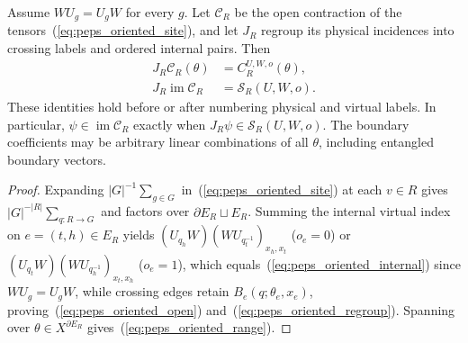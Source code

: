 \begin{lemma}%
    \label{thm:peps_oriented_open_range}
    \leanok
    Assume $WU_g=U_gW$ for every $g$. Let $\mathcal C_R$ be the
    open contraction of the tensors~(\ref{eq:peps_oriented_site}),
    and let $J_R$ regroup its physical incidences into crossing labels
    and ordered internal pairs. Then
    \begin{align}
        J_R\mathcal C_R(\theta)          & =C_R^{U,W,o}(\theta),
        \label{eq:peps_oriented_regroup}                         \\
        J_R\operatorname{im}\mathcal C_R & =\mathcal S_R(U,W,o).
        \label{eq:peps_oriented_range}
    \end{align}
    These identities hold before or after numbering physical and virtual
    labels. In particular, $\psi\in\operatorname{im}\mathcal C_R$
    exactly when $J_R\psi\in\mathcal S_R(U,W,o)$.
    The boundary coefficients may be arbitrary linear combinations of
    all $\theta$, including entangled boundary vectors.
\end{lemma}
\begin{proof}\leanok
    Expanding $|G|^{-1}\sum_{g\in G}$ in~(\ref{eq:peps_oriented_site}) at each
    $v\in R$ gives $|G|^{-|R|}\sum_{q:R\to G}$ and factors over
    $\partial E_R\sqcup E_R$. Summing the internal virtual index on $e=(t,h)\in E_R$
    yields $(U_{q_h}W)(WU_{q_t^{-1}})_{x_h,x_t}$ ($o_e=0$) or
    $(U_{q_t}W)(WU_{q_h^{-1}})_{x_t,x_h}$ ($o_e=1$), which equals~(\ref{eq:peps_oriented_internal})
    since $WU_g=U_gW$, while crossing edges retain $B_e(q;\theta_e,x_e)$,
    proving~(\ref{eq:peps_oriented_open}) and~(\ref{eq:peps_oriented_regroup}).
    Spanning over $\theta\in X^{\partial E_R}$ gives~(\ref{eq:peps_oriented_range}).
\end{proof}


